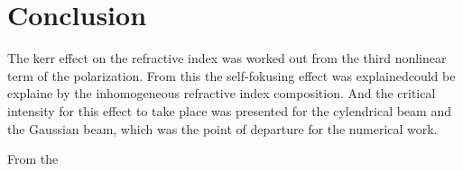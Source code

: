 \chapter{Conclusion}
\label{cha:conclusion}


The kerr effect on the refractive index was worked out from the third nonlinear term of the polarization.
From this the self-fokusing effect was explainedcould be explaine by the inhomogeneous refractive index composition.
And the critical intensity for this effect to take place was presented for the cylendrical beam and the Gaussian beam, which was the point of departure for the numerical work. 

From the 


